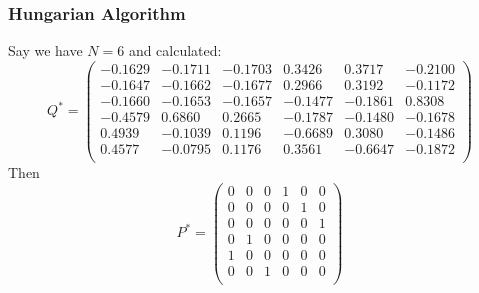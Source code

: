 \documentclass{beamer}
\begin{document}

\begin{frame}
\frametitle{Hungarian Algorithm}
  Say we have $N=6$ and calculated:
  \[Q^* = \begin{pmatrix}
   -0.1629 &  -0.1711 &  -0.1703 &   0.3426 &   0.3717 &  -0.2100\\
   -0.1647 &  -0.1662 &  -0.1677 &   0.2966 &   0.3192 &  -0.1172\\
   -0.1660 &  -0.1653 &  -0.1657 &  -0.1477 &  -0.1861 &   0.8308\\
   -0.4579 &   0.6860 &   0.2665 &  -0.1787 &  -0.1480 &  -0.1678\\
    0.4939 &  -0.1039 &   0.1196 &  -0.6689 &   0.3080 &  -0.1486\\
    0.4577 &  -0.0795 &   0.1176 &   0.3561 &  -0.6647 &  -0.1872\\
  \end{pmatrix}\]
  Then \[P^* = \begin{pmatrix}
      0&0&0&1&0&0\\
      0&0&0&0&1&0\\
      0&0&0&0&0&1\\
      0&1&0&0&0&0\\
      1&0&0&0&0&0\\
      0&0&1&0&0&0\\
    \end{pmatrix}
  \]
\end{frame}

\end{document}

